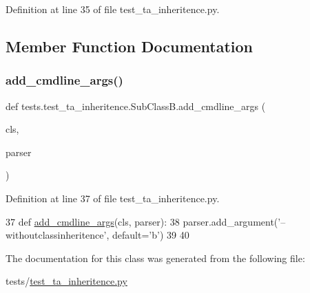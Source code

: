 Definition at line 35 of file test\+\_\+ta\+\_\+inheritence.\+py.



\subsection{Member Function Documentation}
\mbox{\label{classtests_1_1test__ta__inheritence_1_1SubClassB_a9aa7384116305903fbf530d4710e83a3}} 
\subsubsection{\texorpdfstring{add\+\_\+cmdline\+\_\+args()}{add\_cmdline\_args()}}
{\footnotesize\ttfamily def tests.\+test\+\_\+ta\+\_\+inheritence.\+Sub\+Class\+B.\+add\+\_\+cmdline\+\_\+args (\begin{DoxyParamCaption}\item[{}]{cls,  }\item[{}]{parser }\end{DoxyParamCaption})}



Definition at line 37 of file test\+\_\+ta\+\_\+inheritence.\+py.


\begin{DoxyCode}
37     \textcolor{keyword}{def }\hyperlink{namespaceparlai_1_1agents_1_1drqa_1_1config_a62fdd5554f1da6be0cba185271058320}{add\_cmdline\_args}(cls, parser):
38         parser.add\_argument(\textcolor{stringliteral}{'--withoutclassinheritence'}, default=\textcolor{stringliteral}{'b'})
39 
40 
\end{DoxyCode}


The documentation for this class was generated from the following file\+:\begin{DoxyCompactItemize}
\item 
tests/\hyperlink{test__ta__inheritence_8py}{test\+\_\+ta\+\_\+inheritence.\+py}\end{DoxyCompactItemize}
